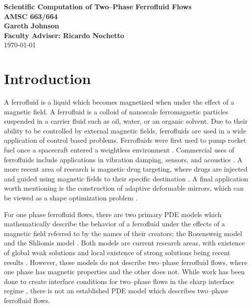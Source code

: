 \documentclass[11pt,fullpage]{article}
\theoremstyle{lemma}
\theoremstyle{definition}
\theoremstyle{lemma}
\begin{document}
	
\begin{center}
	\textbf{\Large{Scientific Computation of Two--Phase Ferrofluid Flows}}
	\\
	\textbf{\Large{AMSC 663/664}} \\ 
	\textbf{\large{Gareth Johnson}}\\
	\textbf{\large{Faculty Adviser: Ricardo Nochetto}}
	\\
	\today
\end{center}

\section{Introduction}
A ferrofluid is a liquid which becomes magnetized when under the effect of a magnetic field. A ferrofluid is a colloid of nanoscale ferromagnetic particles suspended in a carrier fluid such as oil, water, or an organic solvent. Due to their ability to be controlled by external magnetic fields, ferrofluids are used in a wide application of control based problems. Ferrofluids were first used to pump rocket fuel once a spacecraft entered a weightless environment \cite{Rocket}. Commercial uses of ferrofluids include applications in vibration damping, sensors, and acoustics \cite{CommercialAppl}. A more recent area of research is magnetic drug targeting, where drugs are injected and guided using magnetic fields to their specific destination \cite{DrugTarg:1, DrugTarg:2, DrugTarg:3}. A final application worth mentioning is the construction of adaptive deformable mirrors, which can be viewed as a shape optimization problem \cite{FerroMirror:1, FerroMirror:2, FerroMirror:3}. 

For one phase ferrofluid flows, there are two primary PDE models which mathematically describe the behavior of a ferrofluid under the effects of a magnetic field referred to by the names of their creators; the Rosensweig model \cite{Rosensweig} and the Shliomis model \cite{Shliomis}. Both models are current research areas, with existence of global weak solutions and local existence of strong solutions being recent results \cite{PDEResults:1,PDEResults:2, PDEResults:3, PDEResults:4}. However, these models do not describe two--phase ferrofluid flows, where one phase has magnetic properties and the other does not. While work has been done to create interface conditions for two--phase flows in the sharp interface regime \cite{SharpInter:1, SharpInter:2}, there is not an established PDE model which describes two--phase ferrofluid flows.
\end{document}
